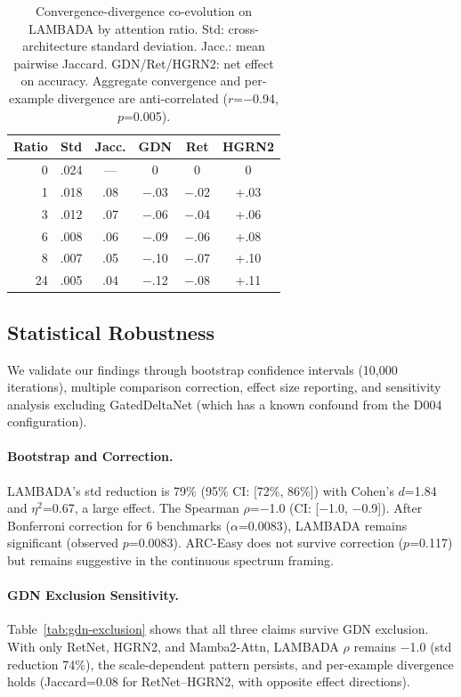 \documentclass[11pt,twocolumn,a4paper]{article}
\begin{document}
\begin{table}[t]
\centering
\small
\begin{tabular}{rccccc}
\toprule
\textbf{Ratio} & \textbf{Std} & \textbf{Jacc.} & \textbf{GDN} & \textbf{Ret} & \textbf{HGRN2} \\
\midrule
0 & .024 & --- & 0 & 0 & 0 \\
1 & .018 & .08 & $-$.03 & $-$.02 & +.03 \\
3 & .012 & .07 & $-$.06 & $-$.04 & +.06 \\
6 & .008 & .06 & $-$.09 & $-$.06 & +.08 \\
8 & .007 & .05 & $-$.10 & $-$.07 & +.10 \\
24 & .005 & .04 & $-$.12 & $-$.08 & +.11 \\
\bottomrule
\end{tabular}
\caption{Convergence-divergence co-evolution on LAMBADA by attention ratio. Std: cross-architecture standard deviation. Jacc.: mean pairwise Jaccard. GDN/Ret/HGRN2: net effect on accuracy. Aggregate convergence and per-example divergence are anti-correlated ($r$=$-$0.94, $p$=0.005).}
\label{tab:bridge}
\end{table}

\subsection{Statistical Robustness}
\label{sec:robustness}

We validate our findings through bootstrap confidence intervals (10,000 iterations), multiple comparison correction, effect size reporting, and sensitivity analysis excluding GatedDeltaNet (which has a known confound from the D004 configuration).

\paragraph{Bootstrap and Correction.}
LAMBADA's std reduction is 79\% (95\% CI: [72\%, 86\%]) with Cohen's $d$=1.84 and $\eta^2$=0.67, a large effect. The Spearman $\rho$=$-$1.0 (CI: [$-$1.0, $-$0.9]). After Bonferroni correction for 6 benchmarks ($\alpha$=0.0083), LAMBADA remains significant (observed $p$=0.0083). ARC-Easy does not survive correction ($p$=0.117) but remains suggestive in the continuous spectrum framing.

\paragraph{GDN Exclusion Sensitivity.}
Table~\ref{tab:gdn-exclusion} shows that all three claims survive GDN exclusion. With only RetNet, HGRN2, and Mamba2-Attn, LAMBADA $\rho$ remains $-$1.0 (std reduction 74\%), the scale-dependent pattern persists, and per-example divergence holds (Jaccard=0.08 for RetNet--HGRN2, with opposite effect directions).
\end{document}
